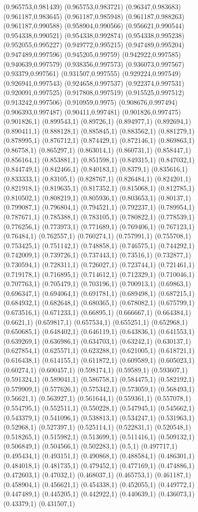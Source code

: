 \documentclass[conference]{IEEEtran}
\begin{document}
\begin{figure}[t]
(0.965753,0.981439) (0.965753,0.983721) (0.96347,0.983683) (0.961187,0.983645) (0.961187,0.985948) (0.961187,0.988263) (0.961187,0.990588) (0.958904,0.990566) (0.956621,0.990544) (0.954338,0.990521) (0.954338,0.992874) (0.954338,0.995238) (0.952055,0.995227) (0.949772,0.995215) (0.947489,0.995204) (0.947489,0.997596) (0.945205,0.99759) (0.942922,0.997585) (0.940639,0.997579) (0.938356,0.997573) (0.936073,0.997567) (0.93379,0.997561) (0.931507,0.997555) (0.929224,0.997549) (0.926941,0.997543) (0.924658,0.997537) (0.922374,0.997531) (0.920091,0.997525) (0.917808,0.997519) (0.915525,0.997512) (0.913242,0.997506) (0.910959,0.9975) (0.908676,0.997494) (0.906393,0.997487) (0.90411,0.997481) (0.901826,0.997475) (0.901826,1) (0.899543,1) (0.89726,1) (0.894977,1) (0.892694,1) (0.890411,1) (0.888128,1) (0.885845,1) (0.883562,1) (0.881279,1) (0.878995,1) (0.876712,1) (0.874429,1) (0.872146,1) (0.869863,1) (0.86758,1) (0.865297,1) (0.863014,1) (0.860731,1) (0.858447,1) (0.856164,1) (0.853881,1) (0.851598,1) (0.849315,1) (0.847032,1) (0.844749,1) (0.842466,1) (0.840183,1) (0.8379,1) (0.835616,1) (0.833333,1) (0.83105,1) (0.828767,1) (0.826484,1) (0.824201,1) (0.821918,1) (0.819635,1) (0.817352,1) (0.815068,1) (0.812785,1) (0.810502,1) (0.808219,1) (0.805936,1) (0.803653,1) (0.80137,1) (0.799087,1) (0.796804,1) (0.794521,1) (0.792237,1) (0.789954,1) (0.787671,1) (0.785388,1) (0.783105,1) (0.780822,1) (0.778539,1) (0.776256,1) (0.773973,1) (0.771689,1) (0.769406,1) (0.767123,1) (0.76484,1) (0.762557,1) (0.760274,1) (0.757991,1) (0.755708,1) (0.753425,1) (0.751142,1) (0.748858,1) (0.746575,1) (0.744292,1) (0.742009,1) (0.739726,1) (0.737443,1) (0.73516,1) (0.732877,1) (0.730594,1) (0.728311,1) (0.726027,1) (0.723744,1) (0.721461,1) (0.719178,1) (0.716895,1) (0.714612,1) (0.712329,1) (0.710046,1) (0.707763,1) (0.705479,1) (0.703196,1) (0.700913,1) (0.69863,1) (0.696347,1) (0.694064,1) (0.691781,1) (0.689498,1) (0.687215,1) (0.684932,1) (0.682648,1) (0.680365,1) (0.678082,1) (0.675799,1) (0.673516,1) (0.671233,1) (0.66895,1) (0.666667,1) (0.664384,1) (0.6621,1) (0.659817,1) (0.657534,1) (0.655251,1) (0.652968,1) (0.650685,1) (0.648402,1) (0.646119,1) (0.643836,1) (0.641553,1) (0.639269,1) (0.636986,1) (0.634703,1) (0.63242,1) (0.630137,1) (0.627854,1) (0.625571,1) (0.623288,1) (0.621005,1) (0.618721,1) (0.616438,1) (0.614155,1) (0.611872,1) (0.609589,1) (0.605023,1) (0.60274,1) (0.600457,1) (0.598174,1) (0.59589,1) (0.593607,1) (0.591324,1) (0.589041,1) (0.586758,1) (0.584475,1) (0.582192,1) (0.579909,1) (0.577626,1) (0.575342,1) (0.573059,1) (0.568493,1) (0.56621,1) (0.563927,1) (0.561644,1) (0.559361,1) (0.557078,1) (0.554795,1) (0.552511,1) (0.550228,1) (0.547945,1) (0.545662,1) (0.543379,1) (0.541096,1) (0.538813,1) (0.534247,1) (0.531963,1) (0.52968,1) (0.527397,1) (0.525114,1) (0.522831,1) (0.520548,1) (0.518265,1) (0.515982,1) (0.513699,1) (0.511416,1) (0.509132,1) (0.506849,1) (0.504566,1) (0.502283,1) (0.5,1) (0.497717,1) (0.495434,1) (0.493151,1) (0.490868,1) (0.488584,1) (0.486301,1) (0.484018,1) (0.481735,1) (0.479452,1) (0.477169,1) (0.474886,1) (0.472603,1) (0.47032,1) (0.468037,1) (0.465753,1) (0.461187,1) (0.458904,1) (0.456621,1) (0.454338,1) (0.452055,1) (0.449772,1) (0.447489,1) (0.445205,1) (0.442922,1) (0.440639,1) (0.436073,1) (0.43379,1) (0.431507,1) 
\end{figure}
\end{document}
